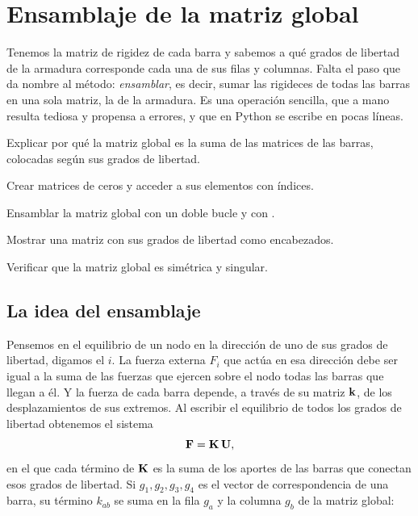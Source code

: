 \chapter{Ensamblaje de la matriz global}\label{cap:ensamblaje}

Tenemos la matriz de rigidez de cada barra y sabemos a qué grados de libertad
de la armadura corresponde cada una de sus filas y columnas. Falta el paso
que da nombre al método: \emph{ensamblar}, es decir, sumar las rigideces de
todas las barras en una sola matriz, la  de la armadura. Es una operación sencilla,
que a mano resulta tediosa y propensa a errores, y que en Python se escribe
en pocas líneas.

\begin{objetivos}
  \item Explicar por qué la matriz global es la suma de las matrices de las
    barras, colocadas según sus grados de libertad.
  \item Crear matrices de ceros y acceder a sus elementos con índices.
  \item Ensamblar la matriz global con un doble bucle y con .
  \item Mostrar una matriz con sus grados de libertad como encabezados.
  \item Verificar que la matriz global es simétrica y singular.
\end{objetivos}

\section{La idea del ensamblaje}\label{sec:idea_ensamblaje}

Pensemos en el equilibrio de un nodo en la dirección de uno de sus grados de
libertad, digamos el $i$. La fuerza externa $F_i$ que actúa en esa dirección
debe ser igual a la suma de las fuerzas que ejercen sobre el nodo todas las
barras que llegan a él. Y la fuerza de cada barra depende, a través de su
matriz $\mathbf{k}$, de los desplazamientos de sus extremos. Al escribir el
equilibrio de todos los grados de libertad obtenemos el sistema
\[
  \mathbf{F} = \mathbf{K}\,\mathbf{U},
\]
en el que cada término de $\mathbf{K}$ es la suma de los aportes de las barras que
conectan esos grados de libertad. Si $g_1, g_2, g_3, g_4$ es el vector de
correspondencia de una barra, su término $k_{ab}$ se suma en la fila $g_a$ y
la columna $g_b$ de la matriz global:

